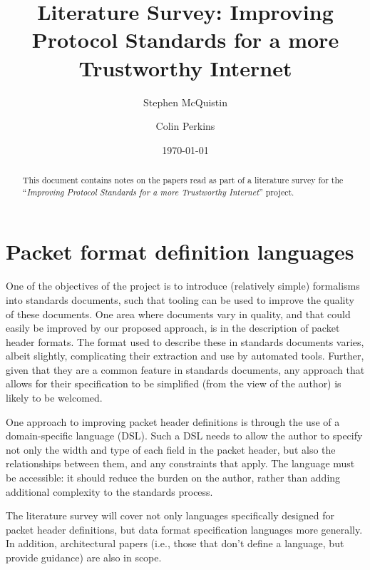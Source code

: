 \documentclass[10pt,a4paper]{article}
\begin{document}
\title{Literature Survey: Improving Protocol Standards for a more Trustworthy Internet}
\author{Stephen McQuistin \and Colin Perkins}
\date{\today}
\maketitle
\begin{abstract}

This document contains notes on the papers read as part of a literature survey for the
``\textit{Improving Protocol Standards for a more Trustworthy Internet}'' project.

\end{abstract}
\section{Packet format definition languages}

One of the objectives of the project is to introduce (relatively simple) formalisms into
standards documents, such that tooling can be used to improve the quality of these
documents. One area where documents vary in quality, and that could easily be
improved by our proposed approach, is in the description of packet header formats. The
format used to describe these in standards documents varies, albeit slightly, complicating
their extraction and use by automated tools. Further, given that they are a common feature
in standards documents, any approach that allows for their specification to be simplified
(from the view of the author) is likely to be welcomed.

One approach to improving packet header definitions is through the use of a
domain-specific language (DSL). Such a DSL needs to allow the author to specify not only
the width and type of each field in the packet header, but also the relationships between
them, and any constraints that apply. The language must be accessible: it should reduce
the burden on the author, rather than adding additional complexity to the standards 
process.

The literature survey will cover not only languages specifically designed for packet
header definitions, but data format specification languages more generally. In addition,
architectural papers (i.e., those that don't define a language, but provide guidance) are
also in scope.

\end{document}
